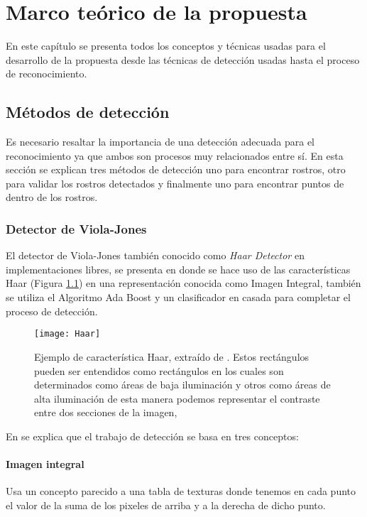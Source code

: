 \chapter{Marco teórico de la propuesta}\label{chap:Conceptos}
En este capítulo se presenta todos los conceptos y técnicas usadas para el desarrollo de la propuesta desde las técnicas de detección usadas hasta el proceso de reconocimiento.

\section{Métodos de detección}

Es necesario resaltar la importancia de una detección adecuada para el reconocimiento ya que ambos son procesos muy relacionados entre sí. En esta sección se explican tres métodos de detección uno para encontrar rostros, otro para validar los rostros detectados y finalmente uno para encontrar puntos de dentro de los rostros.


\subsection{Detector de Viola-Jones}\label{scc:Viola}
El detector de Viola-Jones también conocido como \textit{Haar Detector} en implementaciones libres, se presenta en \cite{viola2001rapid} donde se hace uso de las características Haar (Figura \ref{im:Haar}) en una representación conocida como Imagen Integral, también se utiliza el Algoritmo Ada Boost y un clasificador en casada para completar el proceso de detección.

\begin{figure}[h]
\center
\texttt{[image: Haar]}
\caption{Ejemplo de característica Haar, extraído de \cite{viola2001rapid}. Estos rectángulos pueden ser entendidos como rectángulos en los cuales son determinados como áreas de baja iluminación y otros como áreas de alta iluminación de esta manera podemos representar el contraste entre dos secciones de la imagen,}
\label{im:Haar}
\end{figure}

En \cite{viola2001rapid} se explica que el trabajo de detección se basa en tres conceptos:
\subsubsection{Imagen integral}
Usa un concepto parecido a una tabla de texturas donde tenemos en cada punto el valor de la suma de los pixeles de arriba y a la derecha de dicho punto. 

